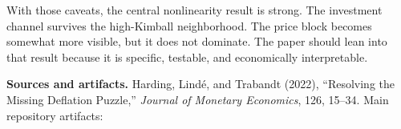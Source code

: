 \documentclass[10pt]{article}
\begin{document}
With those caveats, the central nonlinearity result is strong. The investment channel survives the high-Kimball neighborhood. The price block becomes somewhat more visible, but it does not dominate. The paper should lean into that result because it is specific, testable, and economically interpretable.

\vspace{0.5em}
\begingroup
\scriptsize
\raggedright
\textbf{Sources and artifacts.} Harding, Lind\'e, and Trabandt (2022), ``Resolving the Missing Deflation Puzzle,'' \emph{Journal of Monetary Economics}, 126, 15--34. Main repository artifacts:
\par{}
\par{}
\par{}
\par{}
\endgroup
\end{document}
